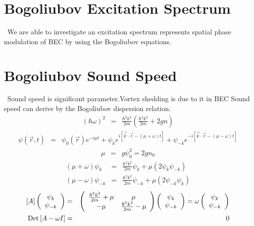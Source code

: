 \documentclass[12pt,a4paper]{report} %
\begin{document}
\section{Bogoliubov Excitation Spectrum}
\ We are able to investigate an excitation spectrum represents spatial phase modulation of BEC
by using the Bogoliubov equations.

\section{Bogoliubov Sound Speed}
\ Sound speed is significant parameter.Vortex shedding is due to it in BEC
Sound speed can derive by the Bogoliubov dispersion relation.
\begin{eqnarray}
(\hbar \omega)^2 & = & \frac{\hbar^2 k^2}{2m} \left( \frac{\hbar^2 k^2}{2m} + 2 g n \right)
\end{eqnarray}
\begin{eqnarray}
\psi(\vec{r}, t) & = & \psi_0 (\vec{r}) e^{-i \mu t}
+ \psi_k e^{i \left[ \vec{k} \cdot \vec{r} - (\mu + \omega) t \right]}
+ \psi_{-k} e^{-i \left[ \vec{k} \cdot \vec{r} - (\mu - \omega) t \right]}
\end{eqnarray}
\begin{eqnarray}
\mu & = & g \psi^2_0 = 2gn_0
\end{eqnarray}
\begin{eqnarray}
(\mu + \omega) \psi_{k} & = & \frac{\hbar^2 k^2}{2m} \psi_{k} + \mu(2 \psi_{k} \psi_{-k} )
\\
(\mu - \omega) \psi_{-k} & = & \frac{\hbar^2 k^2}{2m} \psi_{-k} + \mu(2 \psi_{-k} \psi_k )
\end{eqnarray}
\begin{eqnarray}
\left[ A \right]
\left( \begin{array}{c} \psi_k \\ \psi_{-k} \end{array} \right) 
& = &
\left( \begin{array}{c c}
\frac{\hbar^2 k^2}{2m} + \mu & \mu
\\
-\mu & \frac{\hbar^2 k^2}{2m} - \mu
\end{array} \right)
\left( \begin{array}{c} \psi_k \\ \psi_{-k} \end{array} \right) 
=
\omega
\left( \begin{array}{c} \psi_k \\ \psi_{-k} \end{array} \right) 
\\
{\rm Det} \left[A - \omega I \right] & = & 0
\end{eqnarray}
\fi %
\end{document}
